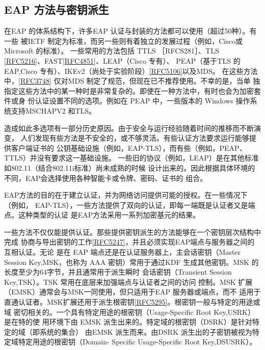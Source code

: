 \subsection{EAP 方法与密钥派生}

在EAP 的体系结构下，许多EAP 认证与封装的方法都可以使用（超过50种）。有一些
被IETF 制定为标准，而另一些则有着独立的发展过程（例如，Cisco或 Microsoft 的标准）。
一些常用的方法包括 TTLS ［RFCS281］、TLS \href{https://www.rfc-editor.org/rfc/rfc5216}{[RFC5216]}、FAST\href{https://www.rfc-editor.org/rfc/rfc4851}{[RFC4851]}、LEAP（Cisco 专有）、
PEAP（基于TLS 的EAP,Cisco 专有）、IKEv2（尚处于实验阶段）\href{https://www.rfc-editor.org/rfc/rfc5106}{[RFC5106]}以及MDS。
在这些方法中，\href{https://www.rfc-editor.org/rfc/rfc3748}{[RFC3748]} 仅对MDS 制定了规范，但现在已不推荐使用。不幸的是，当单
独指定这些方法中的某一种时是非常复杂的。即使在一种方法中，有时也会为加密套件或身
份认证设置不同的选项。例如在 PEAP 中，一些版本的 Windows 操作系统支持MSCHAPV2
和TLS。

造成如此多选项有一部分历史原因。由于安全与运行经验随着时间的推移而不断演变，
人们发现有些方法是不安全的，或不够灵活。有些认证方法要求运行能够提供客户端证书的
公钥基础设施（例如，EAP-TLS），而有些（例如，PEAP、TTLS）并没有要求这一基础设施。
一些旧的协议（例如，LEAP）是在其他标准如802.11（结合802.11i标准）尚未成熟的时候
设计出来的。因此根据具体环境的不同，EAP会选择使用各种智能卡或令牌、密码、证书的
组合。

EAP方法的目的在于建立认证，并为网络访问提供可能的授权。在一些情况下（例如，
EAP-TLS），一些方法提供了双向的认证，即每一端既是认证者又是端点。这种类型的认证
是EAP方法采用一系列加密基元的结果。

一些方法不仅仅能提供认证。那些提供密钥派生的方法能够在一个密钥层次结构中完成
协商与导出密钥的工作\href{https://www.rfc-editor.org/rfc/rfc5247}{[RFC5247]}，并且必须实现EAP端点与服务器之间的互相认证。无论
是在 EAP 端点还是在认证服务器上，主会话密钥（Master Session Key,MSK，也称为 AAA
密钥）常用于通过KDF 生成其他密钥。MSK 的长度至少为64字节，并且通常用于派生瞬时
会话密钥（Transient Session Key,TSK）。TSK 常用在底层来加强端点与认证者之间的访问
控制。MSK 扩展（EMSK）通常会与MSK一同使用，但只适用于EAP 服务器或端点，而不
适用于直通认证者。MSK扩展还用于派生根密钥\href{https://www.rfc-editor.org/rfc/rfc5295}{[RFC5295]}。根密钥一般与特定的用途或域
密切相关的。一个具有特定用途的根密钥（Usage-Specific Root Key,USRK）是在特的使
用环境下由 EMSK 派生出来的。特定域的根密钥（DSRK）是针对特定的域（即系统的集合）
由EMSK 派生而来。由DSRK 派生出的子密钥被视为特定域特定用途的根密钥（Domain-
Specific Usage-Specific Root Key,DSUSRK）。

